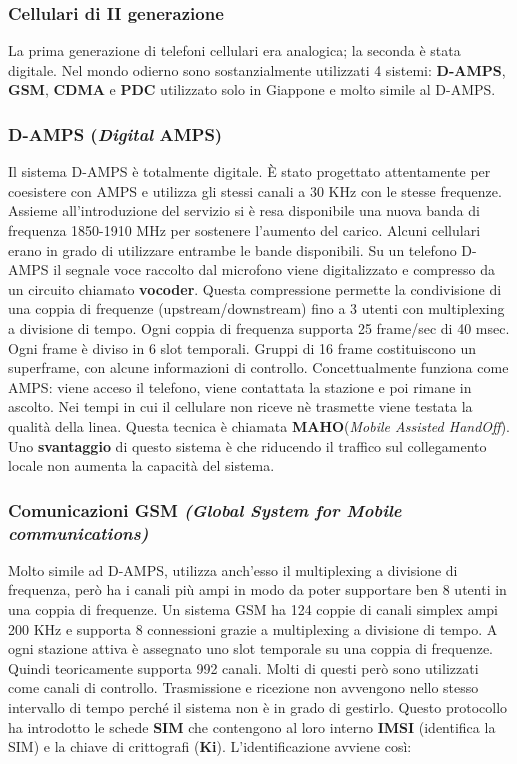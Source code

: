 \subsubsection{Cellulari di II generazione}

La prima generazione di telefoni cellulari era analogica; la seconda è stata digitale.
Nel mondo odierno sono sostanzialmente utilizzati 4 sistemi: \textbf{D-AMPS}, \textbf{GSM}, \textbf{CDMA} e \textbf{PDC} utilizzato solo in Giappone e molto simile al D-AMPS.

\subsubsection*{D-AMPS (\textit{Digital} AMPS)}

Il sistema D-AMPS è totalmente digitale. È stato progettato attentamente per coesistere con AMPS e utilizza gli stessi canali a 30 KHz con le stesse frequenze. Assieme all'introduzione del servizio si è resa disponibile una nuova banda di frequenza 1850-1910 MHz per sostenere l'aumento del carico. Alcuni cellulari erano in grado di utilizzare entrambe le bande disponibili. Su un telefono D-AMPS il segnale voce raccolto dal microfono viene digitalizzato e compresso da un circuito chiamato \textbf{vocoder}. Questa compressione permette la condivisione di una coppia di frequenze (upstream/downstream) fino a 3 utenti con multiplexing a divisione di tempo. Ogni coppia di frequenza supporta 25 frame/sec di 40 msec. Ogni frame è diviso in 6 slot temporali. Gruppi di 16 frame costituiscono un superframe, con alcune informazioni di controllo. Concettualmente funziona come AMPS: viene acceso il telefono, viene contattata la stazione e poi rimane in ascolto.
Nei tempi in cui il cellulare non riceve nè trasmette viene testata la qualità della linea. Questa tecnica è chiamata \textbf{MAHO}(\textit{Mobile Assisted HandOff}).
Uno \textbf{svantaggio} di questo sistema è che riducendo il traffico sul collegamento locale non aumenta la capacità del sistema.

\subsubsection*{Comunicazioni GSM \textit{(Global System for Mobile communications)}}

Molto simile ad D-AMPS, utilizza anch'esso il multiplexing a divisione di frequenza, però ha i canali più ampi in modo da poter supportare ben 8 utenti in una coppia di frequenze. Un sistema GSM ha 124 coppie di canali simplex ampi 200 KHz e supporta 8 connessioni grazie a multiplexing a divisione di tempo. A ogni stazione attiva è assegnato uno slot temporale su una coppia di frequenze. Quindi teoricamente supporta 992 canali. Molti di questi però sono utilizzati come canali di controllo. Trasmissione e ricezione non avvengono nello stesso intervallo di tempo perché il sistema non è in grado di gestirlo. Questo protocollo ha introdotto le schede \textbf{SIM} che contengono al loro interno \textbf{IMSI} (identifica la SIM) e la chiave di crittografi (\textbf{Ki}). L'identificazione avviene così:

